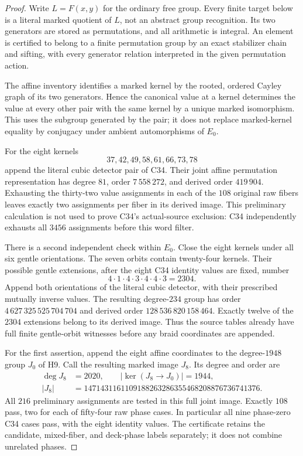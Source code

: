 \begin{proof}
Write $L=F(x,y)$ for the ordinary free group. Every finite
target below is a literal marked quotient of $L$, not an
abstract group recognition. Its two generators are stored
as permutations, and all arithmetic is integral. An element
is certified to belong to a finite permutation group by an
exact stabilizer chain and sifting, with every generator
relation interpreted in the given permutation action.

The affine inventory identifies a marked kernel by the
rooted, ordered Cayley graph of its two generators. Hence
the canonical value at a kernel determines the value at
every other pair with the same kernel by a unique marked
isomorphism. This uses the subgroup generated by the pair;
it does not replace marked-kernel equality by conjugacy
under ambient automorphisms of $E_0$.

For the eight kernels
\[
             37,42,49,58,61,66,73,78
\]
append the literal cubic detector pair of C34. Their joint
affine permutation representation has degree $81$, order
$7\,558\,272$, and derived order $419\,904$. Exhausting the
thirty-two value assignments in each of the $108$ original
raw fibers leaves exactly two assignments per fiber in its
derived image. This preliminary calculation is not used
to prove C34's actual-source exclusion: C34 independently
exhausts all $3456$ assignments before this word filter.

There is a second independent check within $E_0$. Close the
eight kernels under all six gentle orientations. The seven
orbits contain twenty-four kernels. Their possible gentle
extensions, after the eight C34 identity values are fixed,
number
\[
                    4\cdot1\cdot4\cdot3\cdot4\cdot4\cdot3
                         =2304.
\]
Append both orientations of the literal cubic detector,
with their prescribed mutually inverse values. The resulting
degree-$234$ group has order
$4\,627\,325\,525\,704\,704$ and derived order
$128\,536\,820\,158\,464$. Exactly twelve of the $2304$
extensions belong to its derived image. Thus the source
tables already have full finite gentle-orbit witnesses
before any braid coordinates are appended.

For the first assertion, append the eight affine coordinates
to the degree-$1948$ group $J_0$ of H9. Call the resulting
marked image $J_8$. Its degree and order are
\[
 \begin{split}
 \deg J_8&=2020,\qquad |\ker(J_8\to J_0)|=1944,\\
 |J_8|&=1471431161109188263286355468208876736741376.
 \end{split}
                                                        \tag{D23.F41.1}
\]
All $216$ preliminary assignments are tested in this full
joint image. Exactly $108$ pass, two for each of fifty-four
raw phase cases. In particular all nine phase-zero C34
cases pass, with the eight identity values. The certificate
retains the candidate, mixed-fiber, and deck-phase labels
separately; it does not combine unrelated phases.


\end{proof}
